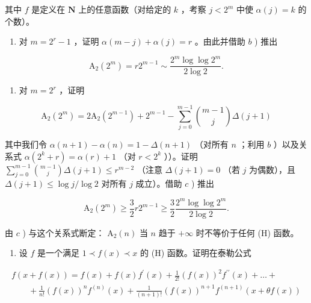 其中 \(f\) 是定义在 \(\mathbf{N}\) 上的任意函数（对给定的 \(k\) ，考察 \(j < 2^{m}\) 中使 \(\alpha(j) = k\) 的个数）。

\begin{enumerate}
\def\labelenumi{\alph{enumi})}
\setcounter{enumi}{2}
\tightlist
\item
  对 \(m = 2^r - 1\) ，证明 \(\alpha(m - j) + \alpha(j) = r\) 。由此并借助 \(b\) ) 推出
\end{enumerate}

\[
\mathrm{A} _ {2} (2 ^ {m}) = r 2 ^ {m - 1} \sim \frac {2 ^ {m} \log \log 2 ^ {m}}{2 \log 2}.
\]

\begin{enumerate}
\def\labelenumi{\alph{enumi})}
\setcounter{enumi}{3}
\tightlist
\item
  对 \(m = 2^{r}\) ，证明
\end{enumerate}

\[
\mathrm{A} _ {2} (2 ^ {m}) = 2 \mathrm{A} _ {2} (2 ^ {m - 1}) + 2 ^ {m - 1} - \sum_ {j = 0} ^ {m - 1} \binom {m - 1} {j} \Delta (j + 1)
\]

其中我们令 \(\alpha(n+1)-\alpha(n)=1-\Delta(n+1)\) （对所有 \(n\) ；利用 \(b\) ）以及关系式 \(\alpha(2^{k}+r)=\alpha(r)+1\) （对 \(r<2^{k}\) ））。证明 \(\sum_{j=0}^{m-1}\binom{m-1}{j}\Delta(j+1)\leqslant r^{m-2}\) （注意 \(\Delta(j+1)=0\) （若 \(j\) 为偶数），且 \(\Delta(j+1)\leqslant\log j/\log 2\) 对所有 \(j\) 成立）。借助 \(c\) ) 推出

\[
\mathrm{A} _ {2} (2 ^ {m}) \geqslant \frac {3}{2} r 2 ^ {m - 1} \geqslant \frac {3}{2} \frac {2 ^ {m} \log \log 2 ^ {m}}{2 \log 2}.
\]

由 \(c\) ) 与这个关系式断定： \(\mathrm{A}_2(n)\) 当 \(n\) 趋于 \(+\infty\) 时不等价于任何 (H) 函数。

\begin{enumerate}
\def\labelenumi{\arabic{enumi})}
\setcounter{enumi}{12}
\tightlist
\item
  设 \(f\) 是一个满足 \(1 \prec f(x) \prec x\) 的 (H) 函数。证明在泰勒公式
\end{enumerate}

\[
\begin{array}{l} f (x + f (x)) = f (x) + f (x) f ^ {\prime} (x) + \frac {1}{2 !} (f (x)) ^ {2} f ^ {\prime \prime} (x) + \dots + \\ \qquad + \frac {1}{n !} (f (x)) ^ {n} f ^ {(n)} (x) + \frac {1}{(n + 1) !} (f (x)) ^ {n + 1} f ^ {(n + 1)} (x + \theta f (x)) \end{array}
\]

